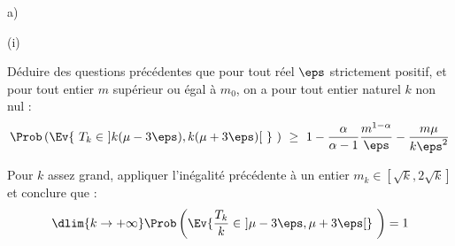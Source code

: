 \documentclass[11pt]{article}%
\begin{document}
\begin{liste}{a)}
\begin{nonoliste}{(i)}
    




  \item Déduire des questions précédentes que pour tout réel $\eps$
    strictement positif, et pour tout entier $m$ supérieur ou égal à
    $m_{0}$, on a pour tout entier naturel $k$ non nul :
    \[
    \Prob\left(\Ev{\ T_{k} \in \ ]k(\mu - 3 \eps), k(\mu + 3 \eps)[ \
      } \ \right) \ \geq \ 1 - \dfrac{\alpha}{\alpha-1}
    \dfrac{m^{1-\alpha}}{\eps} - \dfrac{m \mu}{k \eps^{2}}
    \]

    

  \item Pour $k$ assez grand, appliquer l'inégalité précédente à un
    entier $m_{k} \in [\sqrt{k}, 2\sqrt{k}]$ et conclure que :
    \[
    \dlim{k \to + \infty} \Prob\left(\Ev{\frac{T_{k}}{k} \in \ ] \mu -
        3 \eps, \mu + 3 \eps[} \ \right) = 1
    \]

    
  \end{nonoliste}
\end{liste}
\end{document}
